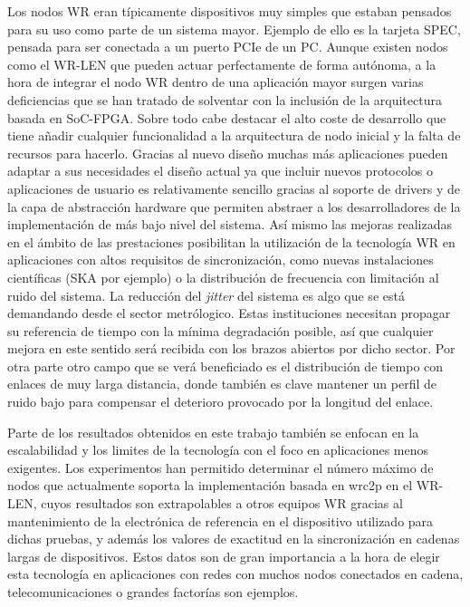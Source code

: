 Los nodos WR eran típicamente dispositivos muy simples que estaban pensados 
para su uso como parte de un sistema mayor. Ejemplo de ello es la tarjeta SPEC, 
pensada para ser conectada a un puerto PCIe de un PC. Aunque existen nodos como 
el WR-LEN que pueden actuar perfectamente de forma autónoma, a la hora de 
integrar el nodo WR dentro de una aplicación mayor surgen varias deficiencias 
que se han tratado de solventar con la inclusión de la arquitectura basada en 
SoC-FPGA. Sobre todo cabe destacar el alto coste de desarrollo que tiene añadir 
cualquier funcionalidad a la arquitectura de nodo inicial y la falta de 
recursos para hacerlo. Gracias al nuevo diseño muchas más aplicaciones pueden 
adaptar a sus necesidades el diseño actual ya que incluir nuevos protocolos o 
aplicaciones de usuario es relativamente sencillo gracias al soporte de drivers 
y de la capa de abstracción hardware que permiten abstraer a los 
desarrolladores de la implementación de más bajo nivel del sistema.
Así mismo las mejoras realizadas en el ámbito de las prestaciones posibilitan 
la utilización de la tecnología WR en aplicaciones con altos requisitos de 
sincronización, como nuevas instalaciones científicas (SKA por ejemplo) o la 
distribución de frecuencia con limitación al ruido del sistema. La reducción 
del \textit{jitter} del sistema es algo que se está demandando desde el sector 
metrólogico. Estas instituciones necesitan propagar su referencia de tiempo con 
la mínima degradación posible, así que cualquier mejora en este sentido será 
recibida con los brazos abiertos por dicho sector. Por otra parte otro campo 
que se verá beneficiado es el distribución de tiempo con enlaces de muy larga 
distancia, donde también es clave mantener un perfil de ruido bajo para 
compensar el deterioro provocado por la longitud del enlace.

Parte de los resultados obtenidos en este trabajo también se enfocan en la 
escalabilidad y los limites de la tecnología con el foco en aplicaciones menos 
exigentes. Los experimentos han permitido determinar el número máximo de nodos 
que actualmente soporta la implementación basada en \gls{wrc2p} en el WR-LEN, 
cuyos resultados son extrapolables a otros equipos WR gracias al mantenimiento 
de la electrónica de referencia en el dispositivo utilizado para dichas 
pruebas, y además los valores de exactitud en la sincronización en cadenas 
largas de dispositivos. Estos datos son de gran importancia a la hora de elegir 
esta tecnología en aplicaciones con redes con muchos nodos conectados en 
cadena, telecomunicaciones o grandes factorías son ejemplos. 

